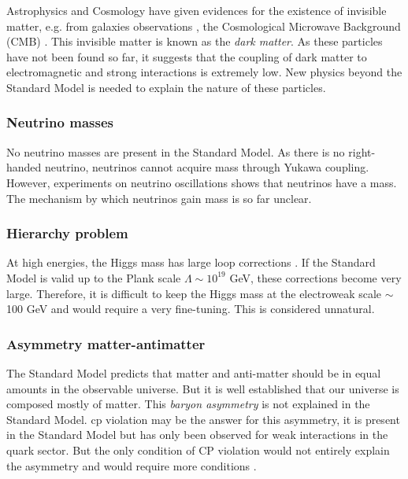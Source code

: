 Astrophysics and Cosmology have given evidences for the existence of invisible matter, e.g. from galaxies observations \cite{Battistelli:2017zrp}, the Cosmological Microwave Background (CMB) \cite{Giesen:2012rp}. This invisible matter is known as the \textit{dark matter}. As these particles have not been found so far, it suggests that the coupling of dark matter to electromagnetic and strong interactions is extremely low. New physics beyond the Standard Model is needed to explain the nature of these particles.

\subsubsection*{Neutrino masses}

No neutrino masses are present in the Standard Model. As there is no right-handed neutrino, neutrinos cannot acquire mass through Yukawa coupling. However, experiments on neutrino oscillations \cite{Dore:2008dp} shows that neutrinos have a mass. The mechanism by which neutrinos gain mass is so far unclear.

\subsubsection*{Hierarchy problem}

At high energies, the Higgs mass has large loop corrections \cite{Vieira:2012ex}. If the Standard Model is valid up to the Plank scale $\Lambda \sim 10^19$ GeV, these corrections become very large. Therefore, it is difficult to keep the Higgs mass at the electroweak scale $\sim$100 GeV and would require a very fine-tuning. This is considered unnatural.

\subsubsection*{Asymmetry matter-antimatter}

The Standard Model predicts that matter and anti-matter should be in equal amounts in the observable universe. But it is well established that our universe is composed mostly of matter. This \textit{baryon asymmetry} is not explained in the Standard Model. \acrshort{cp} violation \cite{Ellis:1978hq} may be the answer for this asymmetry, it is present in the Standard Model but has only been observed for weak interactions in the quark sector. But the only condition of CP violation would not entirely explain the asymmetry and would require more conditions \cite{Sakharov:1967dj}.

